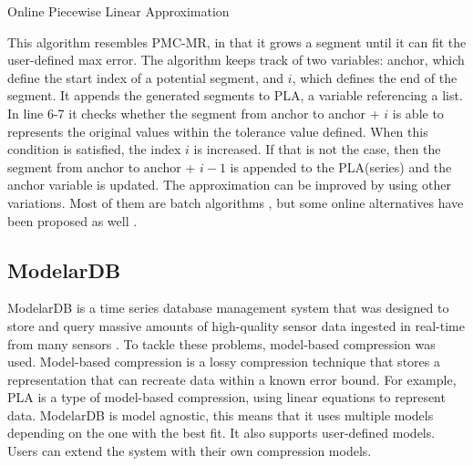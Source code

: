 \begin{algorithm}
\caption{Online Piecewise Linear Approximation \cite{lazaridis2003capturing}}\label{PLA}
\begin{algorithmic}[1]
    \EndWhile
\EndWhile
{}
\EndProcedure
\end{algorithmic}
\end{algorithm}

This algorithm resembles PMC-MR, in that it grows a segment until it can fit the user-defined
max error. The algorithm keeps track of two variables: anchor, which define the start index
of a potential segment, and $i$, which defines the end of the segment. It appends the generated
segments to PLA, a variable referencing a list.  In line 6-7 it checks
whether the segment from anchor to anchor + $i$ is able to represents the original values
within the tolerance value defined.
When this condition is satisfied, the index $i$ is increased. If that is not the case,
then the segment from anchor to anchor + $i - 1$ is appended to the PLA(series)
and the anchor variable is updated. The approximation can be improved by using other variations.
Most of them are batch algorithms \cite{douglas1973algorithms}\cite{park1999fast}
\cite{keogh1998enhanced}, but some online alternatives have been
proposed as well \cite{keogh2001online}.

\subsection{ModelarDB}
ModelarDB is a time series database management system that was designed to store and query
massive amounts of high-quality sensor data ingested in real-time from many sensors
\cite{jensen2018modelardb}.
To tackle these problems, model-based compression was used. Model-based compression is a
lossy compression technique that stores a representation that can recreate data within a
known error bound. For example, PLA is a type of model-based compression, using linear
equations to represent data. ModelarDB is model agnostic, this means that it uses multiple
models depending on the one with the best fit. It also supports user-defined models.
Users can extend the system with their own compression models.

